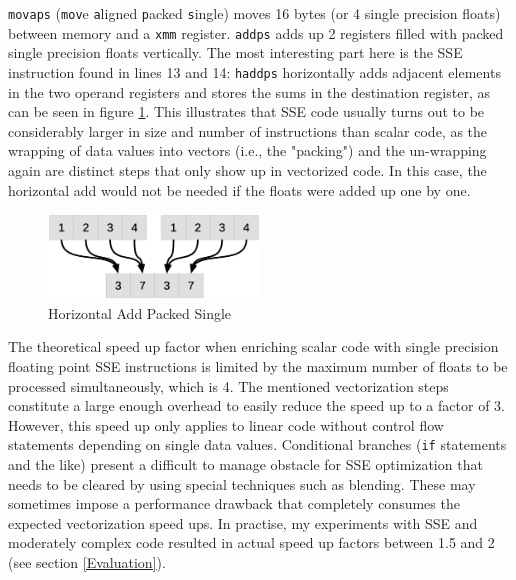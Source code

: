 \texttt{movaps} (\texttt{mov}e \texttt{a}ligned \texttt{p}acked \texttt{s}ingle) moves 16 bytes (or 4 single precision floats) between memory and a \texttt{xmm} register. \texttt{addps} adds up 2 registers filled with packed single precision floats vertically. The most interesting part here is the SSE instruction found in lines 13 and 14: \texttt{haddps} horizontally adds adjacent elements in the two operand registers and stores the sums in the destination register, as can be seen in figure \ref{fig:haddps}. This illustrates that SSE code usually turns out to be considerably larger in size and number of instructions than scalar code, as the wrapping of data values into vectors (i.e., the "packing") and the un-wrapping again are distinct steps that only show up in vectorized code. In this case, the horizontal add would not be needed if the floats were added up one by one.
\begin{figure}[h]
\begin{center}
\includegraphics[width=0.5\textwidth]{img/haddps}
\end{center}
\caption{Horizontal Add Packed Single}
\label{fig:haddps}
\end{figure}

The theoretical speed up factor when enriching scalar code with single precision floating point SSE instructions is limited by the maximum number of floats to be processed simultaneously, which is 4. The mentioned vectorization steps constitute a large enough overhead to easily reduce the speed up to a factor of 3. However, this speed up only applies to linear code without control flow statements depending on single data values. Conditional branches (\texttt{if} statements and the like) present a difficult to manage obstacle for SSE optimization that needs to be cleared by using special techniques such as blending. These may sometimes impose a performance drawback that completely consumes the expected vectorization speed ups. In practise, my experiments with SSE and moderately complex code resulted in actual speed up factors between 1.5 and 2 (see section \ref{Evaluation}).

